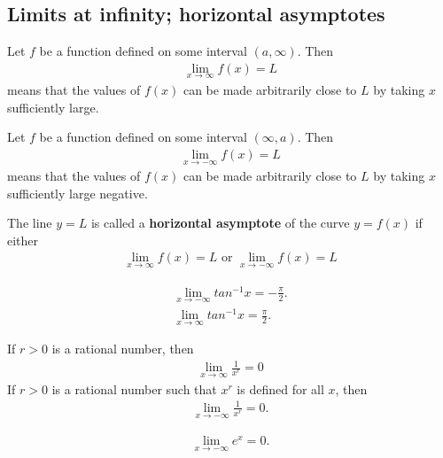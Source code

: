 \documentclass{article}
\begin{document}
\subsection{Limits at infinity; horizontal asymptotes}
\begin{definition}
    Let $f$ be a function defined on some interval $(a,\infty)$. Then
    \begin{align*}
        \lim_{x\to\infty}f(x)=L
    \end{align*}
    means that the values of $f(x)$ can be made arbitrarily close to $L$ by taking $x$ sufficiently large.
\end{definition}
\begin{definition}
    Let $f$ be a function defined on some interval $(\infty, a)$. Then
    \begin{align*}
        \lim_{x\to -\infty}f(x)=L
    \end{align*}
    means that the values of $f(x)$ can be made arbitrarily close to $L$ by taking $x$ sufficiently large negative.
\end{definition}
\begin{definition}
    The line $y=L$ is called a \textbf{horizontal asymptote} of the curve $y=f(x)$ if either
    \begin{align*}
        \lim_{x\to \infty}f(x)=L \text{ or } \lim_{x\to-\infty}f(x)=L
    \end{align*}
\end{definition}
\begin{theorem}
    \begin{align*}
        \lim_{x\to-\infty}tan^{-1}x=-\frac{\pi}{2}.\\
        \lim_{x\to\infty}tan^{-1}x=\frac{\pi}{2}.
    \end{align*}
\end{theorem}
\begin{theorem}
    If $r>0$ is a rational number, then
    \begin{align*}
        \lim_{x\to\infty}\frac{1}{x^r}=0
    \end{align*}
    If $r>0$ is a rational number such that $x^r$ is defined for all $x$, then
    \begin{align*}
        \lim_{x\to-\infty}\frac{1}{x^r}=0.
    \end{align*}
\end{theorem}
\begin{theorem}
    \begin{align*}
        \lim_{x\to-\infty}e^x=0.
    \end{align*}
\end{theorem}
\end{document}
